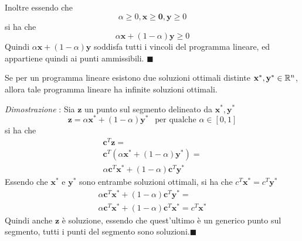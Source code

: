 \documentclass[10pt, letterpaper]{report}
\begin{document}
Inoltre essendo che 
$$ \alpha \ge 0, \mathbf x \ge \mathbf  0, \mathbf y \ge 0$$
si ha che 
$$ \alpha\mathbf x +(1-\alpha)\mathbf y\ge 0$$
Quindi $\alpha\mathbf x +(1-\alpha)\mathbf y$ soddisfa tutti i vincoli del programma lineare, ed appartiene quindi ai punti ammissibili.
\hfill$\blacksquare$
\begin{proposizione}
    Se per un programma lineare esistono due soluzioni ottimali distinte $\mathbf x^*,\mathbf y^*\in {\mathbb R}^n$, allora tale programma lineare ha infinite soluzioni ottimali.
\end{proposizione}
\textit{Dimostrazione} : Sia $ \mathbf z$ un punto sul segmento delineato da $\mathbf x^*,\mathbf y^*$
$$\mathbf z = \alpha\mathbf x^* +(1-\alpha)\mathbf y^* \ \ \text{ per qualche }\alpha \in [0,1] $$
si ha che 
 \begin{eqnarray}
    \mathbf c^T \mathbf z = \\
    \mathbf c^T(\alpha\mathbf x^*  +(1-\alpha)\mathbf y^*)=\\
    \alpha\mathbf c^T\mathbf x^*  +(1-\alpha)\mathbf c^T\mathbf y^*
\end{eqnarray}
Essendo che $\mathbf x^*$ e $\mathbf y^*$ sono entrambe soluzioni ottimali, si ha che $c^T\mathbf x^*=c^T\mathbf y^*$
\begin{eqnarray}
    \alpha\mathbf c^T\mathbf x^*  +(1-\alpha)\mathbf c^T\mathbf y^*=\\ 
    \alpha\mathbf c^T\mathbf x^*  +(1-\alpha)\mathbf c^T\mathbf x^*=
    c^T\mathbf x^*
\end{eqnarray}
Quindi anche $\mathbf z$ è soluzione, essendo che quest'ultimo è un generico punto sul segmento, tutti i punti del segmento sono soluzioni.\hfill$\blacksquare$
\end{document}
